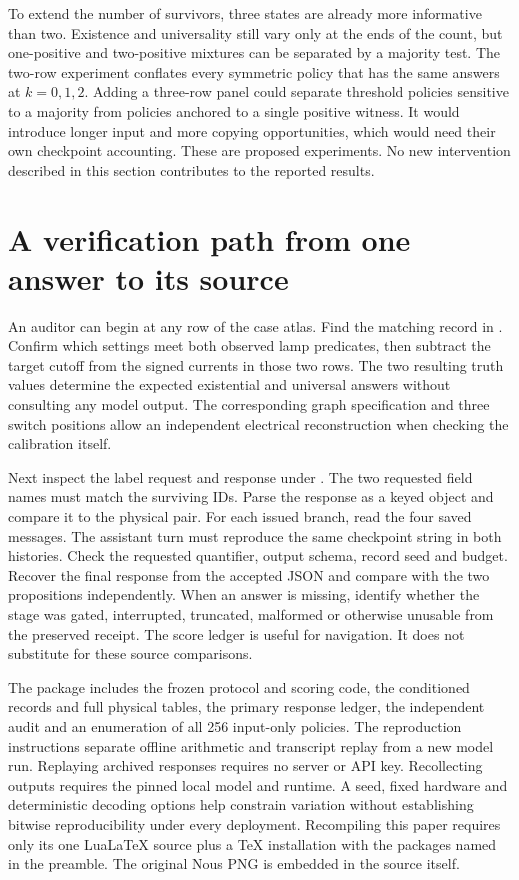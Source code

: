 \documentclass[12pt,letterpaper]{article}
\newcommand{\code}[1]{\texttt{\detokenize{#1}}}
\begin{document}
To extend the number of survivors, three states are already more informative than two. Existence and universality still vary only at the ends of the count, but one-positive and two-positive mixtures can be separated by a majority test. The two-row experiment conflates every symmetric policy that has the same answers at $k=0,1,2$. Adding a three-row panel could separate threshold policies sensitive to a majority from policies anchored to a single positive witness. It would introduce longer input and more copying opportunities, which would need their own checkpoint accounting. These are proposed experiments. No new intervention described in this section contributes to the reported results.

\section{A verification path from one answer to its source}
An auditor can begin at any row of the case atlas. Find the matching record in \code{circuits/records.json}. Confirm which settings meet both observed lamp predicates, then subtract the target cutoff from the signed currents in those two rows. The two resulting truth values determine the expected existential and universal answers without consulting any model output. The corresponding graph specification and three switch positions allow an independent electrical reconstruction when checking the calibration itself.

Next inspect the label request and response under \code{pilot/observed}. The two requested field names must match the surviving IDs. Parse the response as a keyed object and compare it to the physical pair. For each issued branch, read the four saved messages. The assistant turn must reproduce the same checkpoint string in both histories. Check the requested quantifier, output schema, record seed and budget. Recover the final response from the accepted JSON and compare with the two propositions independently. When an answer is missing, identify whether the stage was gated, interrupted, truncated, malformed or otherwise unusable from the preserved receipt. The score ledger is useful for navigation. It does not substitute for these source comparisons.

The package includes the frozen protocol and scoring code, the conditioned records and full physical tables, the primary response ledger, the independent audit and an enumeration of all 256 input-only policies. The reproduction instructions separate offline arithmetic and transcript replay from a new model run. Replaying archived responses requires no server or API key. Recollecting outputs requires the pinned local model and runtime. A seed, fixed hardware and deterministic decoding options help constrain variation without establishing bitwise reproducibility under every deployment. Recompiling this paper requires only its one LuaLaTeX source plus a TeX installation with the packages named in the preamble. The original Nous PNG is embedded in the source itself.
\end{document}
